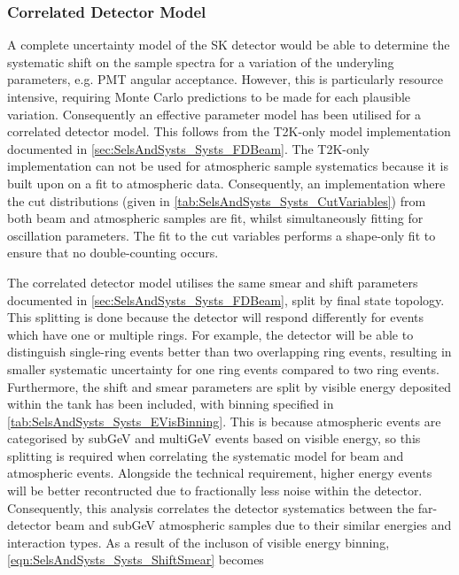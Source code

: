 \subsubsection{Correlated Detector Model}
\label{sec:SelsAndSysts_Systs_Correlated}

A complete uncertainty model of the SK detector would be able to determine the systematic shift on the sample spectra for a variation of the underyling parameters, e.g. PMT angular acceptance. However, this is particularly resource intensive, requiring Monte Carlo predictions to be made for each plausible variation. Consequently an effective parameter model has been utilised for a correlated detector model. This follows from the T2K-only model implementation documented in \autoref{sec:SelsAndSysts_Systs_FDBeam}. The T2K-only implementation can not be used for atmospheric sample systematics because it is built upon on a fit to atmospheric data. Consequently, an implementation where the cut distributions (given in \autoref{tab:SelsAndSysts_Systs_CutVariables}) from both beam and atmospheric samples are fit, whilst simultaneously fitting for oscillation parameters. The fit to the cut variables performs a shape-only fit to ensure that no double-counting occurs.

The correlated detector model utilises the same smear and shift parameters documented in \autoref{sec:SelsAndSysts_Systs_FDBeam}, split by final state topology. This splitting is done because the detector will respond differently for events which have one or multiple rings. For example, the detector will be able to distinguish single-ring events better than two overlapping ring events, resulting in smaller systematic uncertainty for one ring events compared to two ring events. Furthermore, the shift and smear parameters are split by visible energy deposited within the tank has been included, with binning specified in \autoref{tab:SelsAndSysts_Systs_EVisBinning}. This is because atmospheric events are categorised by subGeV and multiGeV events based on visible energy, so this splitting is required when correlating the systematic model for beam and atmospheric events. Alongside the technical requirement, higher energy events will be better recontructed due to fractionally less noise within the detector. Consequently, this analysis correlates the detector systematics between the far-detector beam and subGeV atmospheric samples due to their similar energies and interaction types. As a result of the incluson of visible energy binning, \autoref{eqn:SelsAndSysts_Systs_ShiftSmear} becomes

